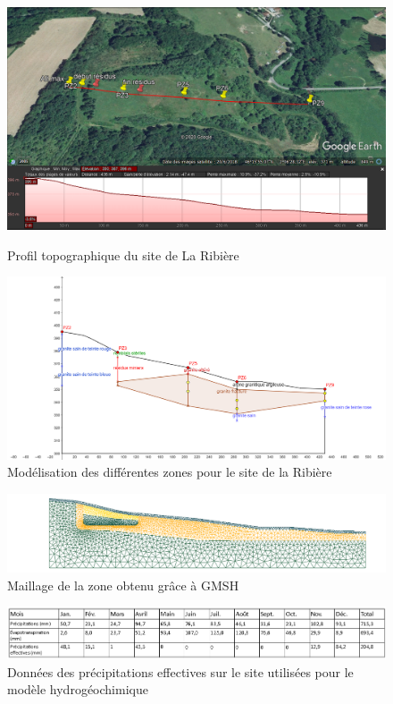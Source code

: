 \documentclass{article}
\begin{document}
\begin{figure}[H]
 \centering
        \includegraphics[width = \textwidth]{plan_coupe_google_earth.png} 
        \label{fig:earth_ribière}
        \caption{Profil topographique du site de La Ribière}
\end{figure}

\begin{figure}[H]
    \centering
    \includegraphics[width=0.8\linewidth]{III_B_3_3.png}
    \caption{Modélisation  des différentes zones pour le site de la Ribière}
    \label{fig:zones_ribieres_geogebra}
\end{figure}

\begin{figure}[H]
    \centering
    \includegraphics[width=1.0\linewidth]{III_B_3_4.png}
    \caption{Maillage de la zone obtenu grâce à GMSH}
    \label{maillage_ribiere}
\end{figure}     

\begin{figure}[H]
 \centering
        \includegraphics[width = \textwidth]{III_B_3_5.png} 
        \caption{Données des précipitations effectives sur le site utilisées pour le modèle hydrogéochimique}
        \label{fig:PE_ribiere}
\end{figure}
\end{document}
